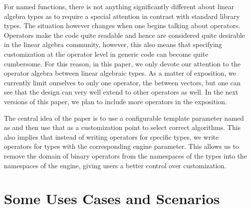 \documentclass[oneside,11pt,a4paper]{jbarticle}
\begin{document}
For named functions, there is not anything significantly different about linear
algebra types as to require a special attention in contrast with standard
library types. The situation however changes when one begins talking about
operators. Operators make the code quite readable and hence are considered quite
desirable in the linear algebra community, however, this also means that
specifying customization at the operator level in generic code can become quite
cumbersome. For this reason, in this paper, we only devote our attention to the
operator algebra between linear algebraic types. As a matter of exposition, we
currently limit ourselves to only one operator, the 
between vectors, but one can see that the design can very well extend to other
operators as well. In the next versions of this paper, we plan to include more
operators in the exposition.

The central idea of the paper is to use a configurable template parameter named
as  and then use that as a customization point to select
correct algorithms. This also implies that instead of writing operators for
specific types, we write operators for types with the corresponding engine
parameter. This allows us to remove the domain of binary operators from the
namespaces of the types into the namespaces of the engine, giving users a better
control over customization.

\section{Some Uses Cases and Scenarios}
\end{document}
